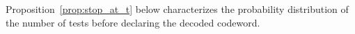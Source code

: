 \documentclass[letterpaper,draftclsnofoot,onecolumn]{IEEEtran}
\newtheorem{lemma}{Lemma}
\begin{document}
Proposition~\ref{prop:stop_at_t} below characterizes the probability distribution of the number of tests before declaring the decoded codeword.

\end{document}
